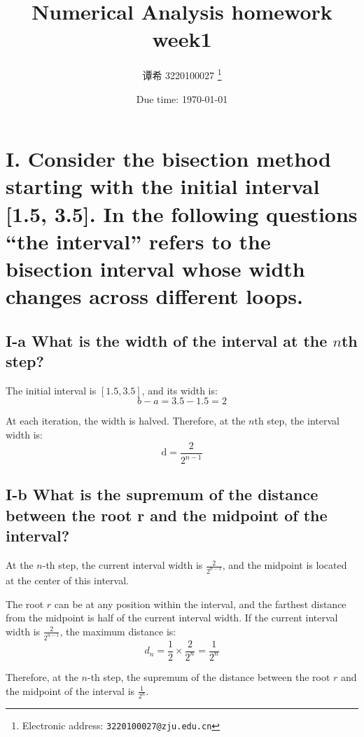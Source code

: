 \documentclass[a4paper]{article}
\begin{document}
\title{Numerical Analysis homework week1}

\author{谭希 3220100027
  \thanks{Electronic address: \texttt{3220100027@zju.edu.cn}}}


\date{Due time: \today}

\maketitle

\section*{I. Consider the bisection method starting with the initial interval [1.5, 3.5]. In the following questions “the
interval” refers to the bisection interval whose width
changes across different loops.}

\subsection*{I-a What is the width of the interval at the $n$th step?}  
  
The initial interval is $[1.5, 3.5]$, and its width is:  
\[b - a = 3.5 - 1.5 = 2\]  
  
At each iteration, the width is halved. Therefore, at the $n$th step, the interval width is:  
\[\text{d} = \frac{2}{2^{n-1}}\]  

\subsection*{I-b What is the supremum of the distance between
the root r and the midpoint of the interval?}

 At the \( n \)-th step, the current interval width is \(\frac{2}{2^{n-1}}\), and the midpoint is located at the center of this interval.

The root \( r \) can be at any position within the interval, and the farthest distance from the midpoint is half of the current interval width. If the current interval width is \(\frac{2}{2^{n-1}}\), the maximum distance is:\[\text{$d_n$} = \frac{1}{2} \times \frac{2}{2^n} = \frac{1}{2^n}\]

Therefore, at the \( n \)-th step, the supremum of the distance between the root \( r \) and the midpoint of the interval is \(\frac{1}{2^n}\).
\end{document}

